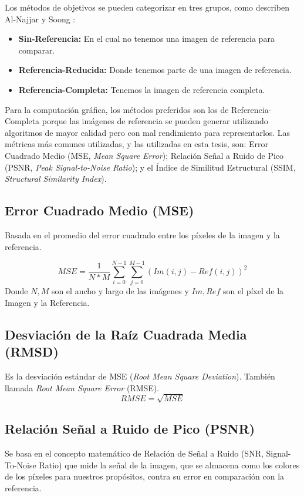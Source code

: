 \documentclass{cslthse-msc}
\begin{document}
Los métodos de objetivos se pueden categorizar en tres grupos, como describen Al-Najjar y Soong \cite{Yusra2012}:

\begin{itemize}
	\item \textbf{Sin-Referencia:} En el cual no tenemos una imagen de referencia para comparar.
	\item \textbf{Referencia-Reducida:} Donde tenemos parte de una imagen de referencia.
	\item \textbf{Referencia-Completa:} Tenemos la imagen de referencia completa.
\end{itemize}


Para la computación gráfica, los métodos preferidos son los de Referencia-Completa porque las imágenes de referencia se pueden generar utilizando algoritmos de mayor calidad pero con mal rendimiento para representarlos. Las métricas más comunes utilizadas, y las utilizadas en esta tesis, son: Error Cuadrado Medio (MSE, \textit{Mean Square Error}); Relación Señal a Ruido de Pico (PSNR, \textit{Peak Signal-to-Noise Ratio}); y el Índice de Similitud Estructural  (SSIM, \textit{Structural Similarity Index}).

\subsection{Error Cuadrado Medio (MSE)}
Basada en el promedio del error cuadrado entre los píxeles de la imagen y la referencia. 

\begin{equation}\label{eq:mse}
	MSE=\frac{1}{N*M}\sum\limits_{i=0}^{N-1}\sum\limits_{j=0}^{M-1}(Im(i,j)-Ref(i,j))^2
\end{equation}
Donde $N, M$ son el ancho y largo de las imágenes y $Im, Ref$ son el píxel de la Imagen y la Referencia.

\subsection{Desviación de la Raíz Cuadrada Media  (RMSD)}
Es la desviación estándar de MSE (\textit{Root Mean Square Deviation}). También llamada \textit{Root Mean Square Error} (RMSE).
\begin{equation}\label{eq:rmse}
RMSE=\sqrt{MSE}
\end{equation}

\subsection{Relación Señal a Ruido de Pico (PSNR)}
Se basa en el concepto matemático de Relación de Señal a Ruido (SNR, Signal-To-Noise Ratio) que mide la señal de la imagen, que se almacena como los colores de los píxeles para nuestros propósitos, contra su error en comparación con la referencia. \cite{Yusra2012}
\end{document}
